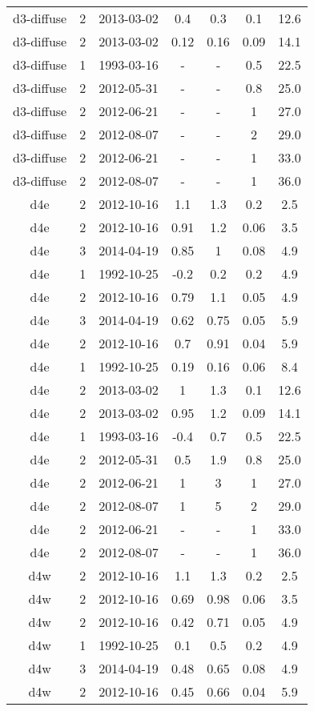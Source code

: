 \begin{table*}[htp]
\begin{tabular}{ccccccc}
d3-diffuse & 2 & 2013-03-02 & 0.4 & 0.3 & 0.1 & 12.6 \\
d3-diffuse & 2 & 2013-03-02 & 0.12 & 0.16 & 0.09 & 14.1 \\
d3-diffuse & 1 & 1993-03-16 & - & - & 0.5 & 22.5 \\
d3-diffuse & 2 & 2012-05-31 & - & - & 0.8 & 25.0 \\
d3-diffuse & 2 & 2012-06-21 & - & - & 1 & 27.0 \\
d3-diffuse & 2 & 2012-08-07 & - & - & 2 & 29.0 \\
d3-diffuse & 2 & 2012-06-21 & - & - & 1 & 33.0 \\
d3-diffuse & 2 & 2012-08-07 & - & - & 1 & 36.0 \\
d4e & 2 & 2012-10-16 & 1.1 & 1.3 & 0.2 & 2.5 \\
d4e & 2 & 2012-10-16 & 0.91 & 1.2 & 0.06 & 3.5 \\
d4e & 3 & 2014-04-19 & 0.85 & 1 & 0.08 & 4.9 \\
d4e & 1 & 1992-10-25 & -0.2 & 0.2 & 0.2 & 4.9 \\
d4e & 2 & 2012-10-16 & 0.79 & 1.1 & 0.05 & 4.9 \\
d4e & 3 & 2014-04-19 & 0.62 & 0.75 & 0.05 & 5.9 \\
d4e & 2 & 2012-10-16 & 0.7 & 0.91 & 0.04 & 5.9 \\
d4e & 1 & 1992-10-25 & 0.19 & 0.16 & 0.06 & 8.4 \\
d4e & 2 & 2013-03-02 & 1 & 1.3 & 0.1 & 12.6 \\
d4e & 2 & 2013-03-02 & 0.95 & 1.2 & 0.09 & 14.1 \\
d4e & 1 & 1993-03-16 & -0.4 & 0.7 & 0.5 & 22.5 \\
d4e & 2 & 2012-05-31 & 0.5 & 1.9 & 0.8 & 25.0 \\
d4e & 2 & 2012-06-21 & 1 & 3 & 1 & 27.0 \\
d4e & 2 & 2012-08-07 & 1 & 5 & 2 & 29.0 \\
d4e & 2 & 2012-06-21 & - & - & 1 & 33.0 \\
d4e & 2 & 2012-08-07 & - & - & 1 & 36.0 \\
d4w & 2 & 2012-10-16 & 1.1 & 1.3 & 0.2 & 2.5 \\
d4w & 2 & 2012-10-16 & 0.69 & 0.98 & 0.06 & 3.5 \\
d4w & 2 & 2012-10-16 & 0.42 & 0.71 & 0.05 & 4.9 \\
d4w & 1 & 1992-10-25 & 0.1 & 0.5 & 0.2 & 4.9 \\
d4w & 3 & 2014-04-19 & 0.48 & 0.65 & 0.08 & 4.9 \\
d4w & 2 & 2012-10-16 & 0.45 & 0.66 & 0.04 & 5.9 \\

\end{tabular}
\end{table*}
